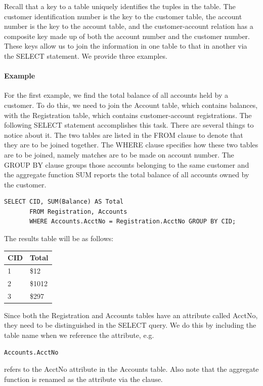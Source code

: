 Recall that a key to a table uniquely identifies the tuples in the
table.  The customer identification number is the key to the customer
table, the account number is the key to the account table, and the
customer-account relation has a composite key made up of both the
account number and the customer number.  These keys allow us to 
join the information in one table to that in another via the SELECT statement.
We provide three examples.

\paragraph{Example} 
For the first example, we find the total balance of all accounts 
held by a customer.
To do this, we need to join the Account table, which contains balances, 
with the Registration table, which contains customer-account registrations.
The following SELECT statement accomplishes this task.
There are several things to notice about it.
The two tables are listed in the FROM clause to denote that
they are to be joined together.
The WHERE clause specifies how these two tables are to be joined, 
namely matches are to be made on account number.
The GROUP BY clause groups those accounts belonging
to the same customer and the aggregate function SUM
reports the total balance of all accounts owned by the customer.

\begin{verbatim}
SELECT CID, SUM(Balance) AS Total 
       FROM Registration, Accounts 
       WHERE Accounts.AcctNo = Registration.AcctNo GROUP BY CID;
\end{verbatim}

The results table will be as follows:

\begin{tabular}{ll}
CID & Total\\
\hline
1 & \$12\\
2 & \$1012\\
3 & \$297\\
\end{tabular}

Since both the Registration and Accounts tables have an attribute
called AcctNo, they need to be distinguished in the SELECT query.
We do this by including the table name when we reference the
attribute, e.g. \begin{verbatim}Accounts.AcctNo\end{verbatim} 
refers to the AcctNo attribute in the Accounts table.
Also note that the aggregate function  is 
renamed as the attribute  via the 
clause.

